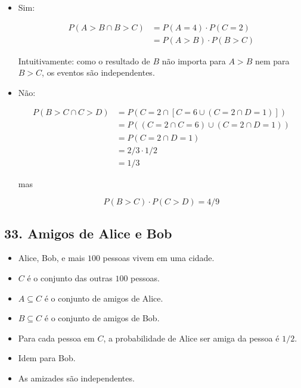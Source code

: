 \documentclass[
  11pt]{report}
\begin{document}
\begin{itemize}
\item
  Sim:

  \[
  \begin{aligned}
  P(A > B \cap B > C) &= P(A = 4) \cdot P(C = 2) \\
  &= P(A > B) \cdot P(B > C)
  \end{aligned}
  \]

  Intuitivamente: como o resultado de $B$ não importa para $A > B$ nem para $B > C$, os eventos são independentes.
\item
  Não:

  \[
  \begin{aligned}
    P(B > C \cap C > D) 
    &= P(C = 2 \cap [C = 6 \cup (C = 2 \cap D = 1)]) \\
    &= P((C = 2 \cap C = 6) \cup (C = 2 \cap D = 1)) \\
    &= P(C = 2 \cap D = 1) \\
    &= 2/3 \cdot 1/2 \\
    &= 1/3
  \end{aligned}
  \]

  mas

  \[
  P(B > C) \cdot P(C > D) = 4/9
  \]
\end{itemize}

\hypertarget{amigos}{%
\subsection*{33. Amigos de Alice e Bob}\label{amigos}}

\begin{rmdbox}

\begin{itemize}
\item
  Alice, Bob, e mais $100$ pessoas vivem em uma cidade.
\item
  $C$ é o conjunto das outras $100$ pessoas.
\item
  $A \subseteq C$ é o conjunto de amigos de Alice.
\item
  $B \subseteq C$ é o conjunto de amigos de Bob.
\item
  Para cada pessoa em $C$, a probabilidade de Alice ser amiga da pessoa é $1/2$.
\item
  Idem para Bob.
\item
  As amizades são independentes.
\end{itemize}

\end{rmdbox}
\end{document}
